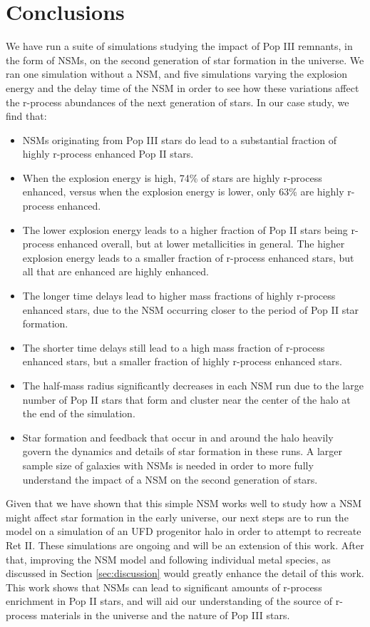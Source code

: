 \documentclass[fleqn,usenatbib]{mnras}
\begin{document}
\section{Conclusions} \label{sec:conclusion}

We have run a suite of simulations studying the impact of Pop III remnants, in the form of NSMs, on the second generation of star formation in the universe. We ran one simulation without a NSM, and five simulations varying the explosion energy and the delay time of the NSM in order to see how these variations affect the r-process abundances of the next generation of stars. In our case study, we find that:
\begin{itemize}
	\item NSMs originating from Pop III stars do lead to a substantial fraction of highly r-process enhanced Pop II stars.
	\item When the explosion energy is high, 74\% of stars are highly r-process enhanced, versus when the explosion energy is lower, only 63\% are highly r-process enhanced. 
	\item The lower explosion energy leads to a higher fraction of Pop II stars being r-process enhanced overall, but at lower metallicities in general. The higher explosion energy leads to a smaller fraction of r-process enhanced stars, but all that are enhanced are highly enhanced. 
	\item The longer time delays lead to higher mass fractions of highly r-process enhanced stars, due to the NSM occurring closer to the period of Pop II star formation. 
	\item The shorter time delays still lead to a high mass fraction of r-process enhanced stars, but a smaller fraction of highly r-process enhanced stars.
	\item The half-mass radius significantly decreases in each NSM run due to the large number of Pop II stars that form and cluster near the center of the halo at the end of the simulation. 
	\item Star formation and feedback that occur in and around the halo heavily govern the dynamics and details of star formation in these runs. A larger sample size of galaxies with NSMs is needed in order to more fully understand the impact of a NSM on the second generation of stars. 
\end{itemize}

Given that we have shown that this simple NSM works well to study how a NSM might affect star formation in the early universe, our next steps are to run the model on a simulation of an UFD progenitor halo in order to attempt to recreate Ret II. These simulations are ongoing and will be an extension of this work. After that, improving the NSM model and following individual metal species, as discussed in Section \ref{sec:discussion} would greatly enhance the detail of this work. This work shows that NSMs can lead to significant amounts of r-process enrichment in Pop II stars, and will aid our understanding of the source of r-process materials in the universe and the nature of Pop III stars.
\end{document}
